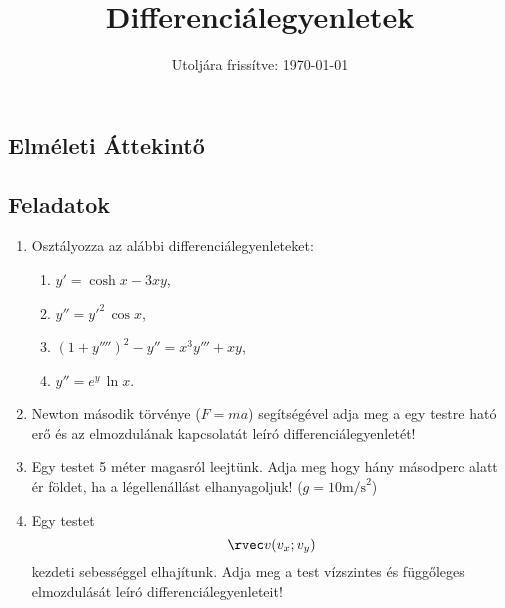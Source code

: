 \documentclass[a4paper, 12pt]{scrartcl}
\title{Differenciálegyenletek}
\date{Utoljára frissítve: \today}
\begin{document}
\maketitle

\subsection{Elméleti Áttekintő}

\clearpage
\subsection{Feladatok}

\begin{enumerate}
  \item Osztályozza az alábbi differenciálegyenleteket:
        \begin{multicols}{2}
          \begin{enumerate}
            \item $y' = \cosh x - 3xy$,
            \item $y'' = y'^2 \, \cos x$,
            \item $\left( 1 + y'''' \right)^2 - y'' = x^3 y''' + xy$,
            \item $y'' = e^y \, \ln x$.
          \end{enumerate}
        \end{multicols}

  \item Newton második törvénye ($F = ma$) segítségével adja meg a egy testre
        ható erő és az elmozdulának kapcsolatát leíró differenciálegyenletét!

  \item Egy testet 5 méter magasról leejtünk. Adja meg hogy hány másodperc
        alatt ér földet, ha a légellenállást elhanyagoljuk!
        ($g = 10 \text{m/s}^2$)

  \item Egy testet $$\rvec v(v_x; v_y)$$ kezdeti sebességgel elhajítunk. Adja
        meg a test vízszintes és függőleges elmozdulását leíró
        differenciálegyenleteit!


\end{enumerate}
\end{document}
